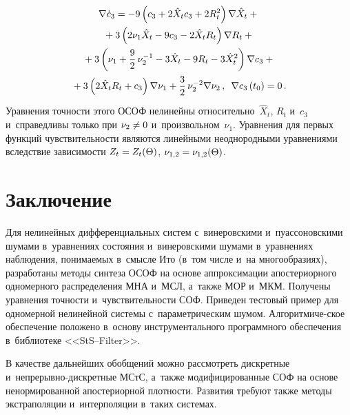 \begin{multicols}{2}
 \vspace*{-12pt}
  
  \noindent
  \begin{multline*}
\nabla \dot c_3= - 9 \left(c_3 + 2 \hat X_t c_3 + 2 R_t^2\right) 
\nabla \hat X_t + {}\\
{}+3 \left(2 \nu_1 \hat X_t - 9 c_3 - 2 \hat X_t R_t\right) \nabla R_t+{}\\
{}+3 \left(\nu_1 + \fr{9}{2}\,\nu_2^{-1} - 3 \hat X_t - 9 R_t - 3 \hat X_t^2\right) 
\nabla c_3 + {}\\
{}+3 \left(2 \hat X_t R_t + c_3\right) \nabla \nu_1 + \fr{3}{2}\,
\nu_2^{-2} \nabla \nu_2\,,
\enskip \nabla c_3 \left(t_0\right) =0\,. %
\end{multline*}
Уравнения точности этого ОСОФ нелинейны относительно~$\hat X_t$, $R_t$ и~$c_3$ 
и~справедливы только при  $\nu_2 \hm\ne 0$ и~произвольном~$\nu_1$.
Уравнения для первых функций чувствительности являются 
линейными неоднородными уравнениями вследствие зависимости $Z_t \hm= Z_t(\Theta)$, 
$\nu_{1,2}\hm = \nu_{1,2} (\Theta)$.

\vspace*{-3pt}

\section{Заключение}

Для нелинейных дифференциальных систем с~винеровскими и~пуассоновскими шумами 
в~уравнениях состояния и~винеровскими шумами в~уравнениях наблюдения, понимаемых 
в~смысле Ито (в~том числе и~на многообразиях), разработаны методы синтеза ОСОФ 
на основе аппроксимации апостериорного одномерного 
распределения МНА и~МСЛ, 
а~также МОР и~МКМ. Получены уравнения точности 
и~чувствительности  СОФ. Приведен тестовый пример для одномерной 
нелинейной сис\-те\-мы с~параметрическим шумом.
Алгоритмиче-\linebreak ское обеспечение положено в~основу инструментального программного 
обеспечения в~библиотеке <<StS--Filter>>.

В качестве дальнейших обобщений можно рассмотреть дискретные 
и~не\-пре\-рыв\-но-дис\-крет\-ные МСтС, 
а~также модифицированные СОФ на основе ненормированной 
апостериорной плотности. Развития требуют также методы экстраполяции и~интерполяции 
в~таких системах.

\vspace*{-3pt}

{\small\frenchspacing
 {%
 \begin{thebibliography}{99}


\end{thebibliography}}}
\end{multicols}
